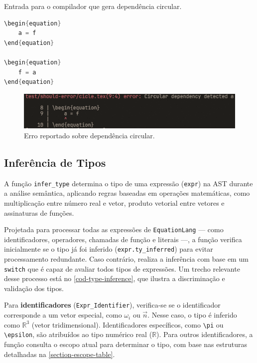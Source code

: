 \begin{codigo}[H]
    \caption{\small Entrada para o compilador que gera dependência circular.}
    \label{cod-grafo-simbol-deps}
\begin{lstlisting}[language=C, numbers=none, frame=none, inputencoding=latin1]
\begin{equation}
    a = f
\end{equation}

\begin{equation}
    f = a
\end{equation}

\end{lstlisting}
\end{codigo}

\begin{figure}[H]
        \caption{\label{fig-deps-circular} \small Erro reportado sobre dependência circular.}
    \begin{center}
        \includegraphics[scale=0.5]{./Imagens/error-circular-deps.png}
    \end{center}
\end{figure}


\subsection{Inferência de Tipos} \label{subsection-type-inference}


A função \verb`infer_type` determina o tipo de uma expressão (\verb`expr`) na AST durante a análise semântica, aplicando regras baseadas em operações matemáticas, como multiplicação entre número real e vetor, produto vetorial entre vetores e assinaturas de funções.

Projetada para processar todas as expressões de \texttt{EquationLang} — como identificadores, operadores, chamadas de função e literais —, a função verifica inicialmente se o tipo já foi inferido (\verb"expr.ty_inferred") para evitar processamento redundante. Caso contrário, realiza a inferência com base em um \verb"switch" que é capaz de avaliar todos tipos de expressões. Um trecho relevante desse processo está no \autoref{cod-type-inference}, que ilustra a discriminação e validação dos tipos.

Para \textbf{identificadores} (\verb"Expr_Identifier"), verifica-se se o identificador corresponde a um vetor especial, como $\omega_i$ ou $\vec{n}$. Nesse caso, o tipo é inferido como $\mathbb{R}^3$ (vetor tridimensional). Identificadores específicos, como \verb"\pi" ou \verb"\epsilon", são atribuídos ao tipo numérico real ($\mathbb{R}$). Para outros identificadores, a função consulta o escopo atual para determinar o tipo, com base nas estruturas detalhadas na \autoref{section-escope-table}.

